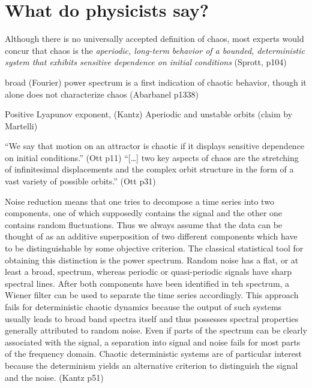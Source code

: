 \documentclass[11pt]{article}
\begin{document}
\section{What do physicists say?}
Although there is no universally accepted definition of chaos,
most experts would concur that chaos is the {\it aperiodic,
  long-term behavior of a bounded, deterministic system
that exhibits sensitive dependence on initial conditions} (Sprott, p104)

broad (Fourier) power spectrum is a first indication of chaotic behavior,
though it alone does not characterize chaos (Abarbanel p1338)

Positive Lyapunov exponent, (Kantz)
Aperiodic and unstable orbits (claim by Martelli)

``We say that motion on an attractor is chaotic if
it displays sensitive dependence on initial conditions.'' (Ott p11)
``[\ldots] two key aspects of chaos are the stretching of infinitesimal displacements
and the complex orbit structure in the form of a vast variety of possible orbits.'' (Ott p31)

Noise reduction means that one tries to decompose a time series into
two components, one of which supposedly contains the signal and the other
one contains random fluctuations. Thus we always assume that the data
can be thought of as an additive superposition of two different components which
have to be distinguishable by some objective criterion. The classical statistical
tool for obtaining this distinction is the power spectrum. Random noise has
a flat, or at least a broad, spectrum, whereas periodic or quasi-periodic
signals have sharp spectral lines. After both components have been identified
in teh spectrum, a Wiener filter can be used to separate the time series
accordingly.
This approach fails for deterministic chaotic dynamics because the output
of such systems usually leads to broad band spectra itself and thus possesses
spectral properties generally attributed to random noise. Even if parts of the
spectrum can be clearly associated with the signal, a separation into signal and
noise fails for most parts of the frequency domain. Chaotic deterministic systems
are of particular interest because the determinism yields an alternative criterion
to distinguish the signal and the noise. (Kantz p51)
\end{document}
